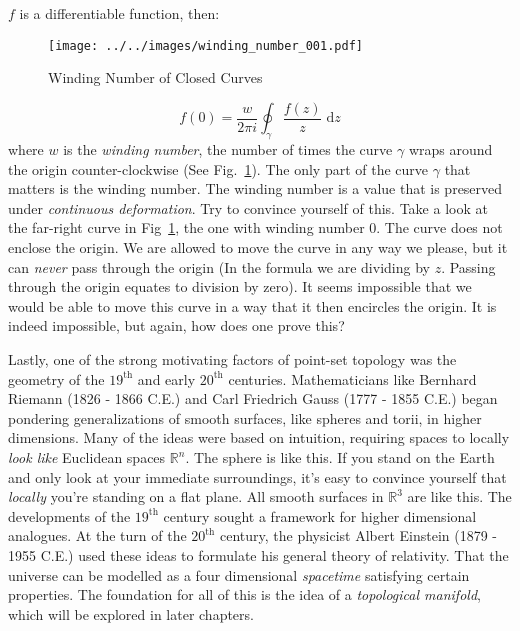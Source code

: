     $f$ is a differentiable function, then:
    \begin{figure}
        \centering
        \texttt{[image: ../../images/winding\_number\_001.pdf]}
        \caption{Winding Number of Closed Curves}
        \label{fig:winding_number_001}
    \end{figure}
    \begin{equation}
        f(0)=\frac{w}{2\pi{i}}\oint_{\gamma}\frac{f(z)}{z}\;\textrm{d}z
    \end{equation}
    where $w$ is the \textit{winding number}, the number of times the curve
    $\gamma$ wraps around the origin counter-clockwise
    (See Fig.~\ref{fig:winding_number_001}). The only part of the curve
    $\gamma$ that matters is the winding number. The winding number is a value
    that is preserved under \textit{continuous deformation}. Try to convince
    yourself of this. Take a look at the far-right curve in
    Fig~\ref{fig:winding_number_001}, the one with winding number 0. The curve
    does not enclose the origin. We are allowed to move the curve in any way
    we please, but it can \textit{never} pass through the origin
    (In the formula we are dividing by $z$. Passing through the origin equates
    to division by zero). It seems impossible that we would be able to move this
    curve in a way that it then encircles the origin. It is indeed impossible,
    but again, how does one prove this?
    \par\hfill\par
    Lastly, one of the strong motivating factors of point-set topology was
    the geometry of the $19^{\textrm{th}}$ and early
    $20^{\textrm{th}}$ centuries. Mathematicians like
    Bernhard Riemann (1826 - 1866 C.E.) and Carl Friedrich Gauss
    (1777 - 1855 C.E.) began pondering generalizations of smooth surfaces,
    like spheres and torii, in higher dimensions. Many of the ideas were based
    on intuition, requiring spaces to locally \textit{look like} Euclidean
    spaces $\mathbb{R}^{n}$. The sphere is like this. If you stand on the Earth
    and only look at your immediate surroundings, it's easy to convince yourself
    that \textit{locally} you're standing on a flat plane. All smooth surfaces
    in $\mathbb{R}^{3}$ are like this. The developments of the
    $19^{\textrm{th}}$ century sought a framework for higher dimensional
    analogues. At the turn of the $20^{\textrm{th}}$ century, the physicist
    Albert Einstein (1879 - 1955 C.E.) used these ideas to formulate his
    general theory of relativity. That the universe can be modelled as a
    four dimensional \textit{spacetime} satisfying certain properties. The
    foundation for all of this is the idea of a \textit{topological manifold},
    which will be explored in later chapters.

